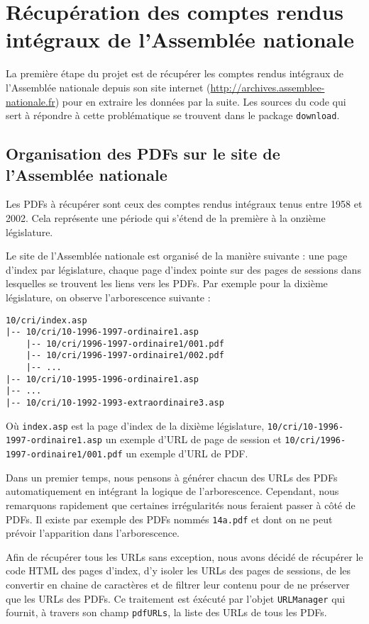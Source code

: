 \section[Récupération des comptes rendus intégraux]{Récupération des comptes rendus intégraux de l'Assemblée nationale}

La première étape du projet est de récupérer les comptes rendus intégraux de l'Assemblée nationale depuis son site internet (\url{http://archives.assemblee-nationale.fr}) pour en extraire les données par la suite. Les sources du code qui sert à répondre à cette problématique se trouvent dans le package \verb|download|.

\subsection{Organisation des PDFs sur le site de l'Assemblée nationale}

Les PDFs à récupérer sont ceux des comptes rendus intégraux tenus entre 1958 et 2002. Cela représente une période qui s'étend de la première à la onzième législature.

Le site de l'Assemblée nationale est organisé de la manière suivante : une page d'index par législature, chaque page d'index pointe sur des pages de sessions dans lesquelles se trouvent les liens vers les PDFs. Par exemple pour la dixième législature, on observe l'arborescence suivante :
\begin{verbatim}
10/cri/index.asp
|-- 10/cri/10-1996-1997-ordinaire1.asp
    |-- 10/cri/1996-1997-ordinaire1/001.pdf
    |-- 10/cri/1996-1997-ordinaire1/002.pdf
    |-- ...
|-- 10/cri/10-1995-1996-ordinaire1.asp
|-- ...
|-- 10/cri/10-1992-1993-extraordinaire3.asp
\end{verbatim}
Où \verb|index.asp| est la page d'index de la dixième législature, \verb|10/cri/10-1996-1997-ordinaire1.asp| un exemple d'URL de page de session et \verb|10/cri/1996-1997-ordinaire1/001.pdf| un exemple d'URL de PDF.

Dans un premier temps, nous pensons à générer chacun des URLs des PDFs automatiquement en intégrant la logique de l'arborescence. Cependant, nous remarquons rapidement que certaines irrégularités nous feraient passer à côté de PDFs. Il existe par exemple des PDFs nommés \verb|14a.pdf| et dont on ne peut prévoir l'apparition dans l'arborescence.

Afin de récupérer tous les URLs sans exception, nous avons décidé de récupérer le code HTML des pages d'index, d'y isoler les URLs des pages de sessions, de les convertir en chaine de caractères et de filtrer leur contenu pour de ne préserver que les URLs des PDFs. Ce traitement est éxécuté par l'objet \verb|URLManager| qui fournit, à travers son champ \verb|pdfURLs|, la liste des URLs de tous les PDFs.

